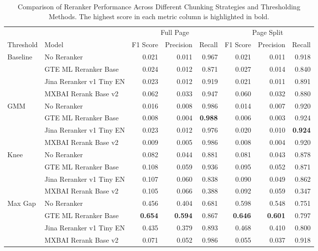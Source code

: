 \begin{table*}[htbp]
\centering
\footnotesize
\setlength{\tabcolsep}{3pt}
\caption{Comparison of Reranker Performance Across Different Chunking Strategies and Thresholding Methods. The highest score in each metric column is highlighted in bold.}
\label{tab:reranker_performance}
\begin{tabular}{llrrrrrr}
\toprule
 &  & \multicolumn{3}{c}{Full Page} & \multicolumn{3}{c}{Page Split} \\
 Threshold & Model & F1 Score & Precision & Recall & F1 Score & Precision & Recall \\
\midrule
\multirow[t]{4}{*}{Baseline} & No Reranker & 0.021 & 0.011 & 0.967 & 0.021 & 0.011 & 0.918 \\
 & GTE ML Reranker Base & 0.024 & 0.012 & 0.871 & 0.027 & 0.014 & 0.840 \\
 & Jina Reranker v1 Tiny EN & 0.023 & 0.012 & 0.919 & 0.021 & 0.011 & 0.891 \\
 & MXBAI Rerank Base v2 & 0.062 & 0.033 & 0.947 & 0.060 & 0.032 & 0.880 \\
\cline{1-8}
\multirow[t]{4}{*}{GMM} & No Reranker & 0.016 & 0.008 & 0.986 & 0.014 & 0.007 & 0.920 \\
 & GTE ML Reranker Base & 0.008 & 0.004 & \textbf{0.988} & 0.006 & 0.003 & 0.924 \\
 & Jina Reranker v1 Tiny EN & 0.023 & 0.012 & 0.976 & 0.020 & 0.010 & \textbf{0.924} \\
 & MXBAI Rerank Base v2 & 0.009 & 0.005 & 0.986 & 0.008 & 0.004 & 0.920 \\
\cline{1-8}
\multirow[t]{4}{*}{Knee} & No Reranker & 0.082 & 0.044 & 0.881 & 0.081 & 0.043 & 0.878 \\
 & GTE ML Reranker Base & 0.108 & 0.059 & 0.936 & 0.095 & 0.052 & 0.871 \\
 & Jina Reranker v1 Tiny EN & 0.107 & 0.060 & 0.838 & 0.090 & 0.049 & 0.862 \\
 & MXBAI Rerank Base v2 & 0.105 & 0.066 & 0.388 & 0.092 & 0.059 & 0.347 \\
\cline{1-8}
\multirow[t]{4}{*}{Max Gap} & No Reranker & 0.456 & 0.404 & 0.681 & 0.598 & 0.548 & 0.751 \\
 & GTE ML Reranker Base & \textbf{0.654} & \textbf{0.594} & 0.867 & \textbf{0.646} & \textbf{0.601} & 0.797 \\
 & Jina Reranker v1 Tiny EN & 0.435 & 0.379 & 0.893 & 0.468 & 0.410 & 0.800 \\
 & MXBAI Rerank Base v2 & 0.071 & 0.052 & 0.986 & 0.055 & 0.037 & 0.918 \\

\end{tabular}
\end{table*}

